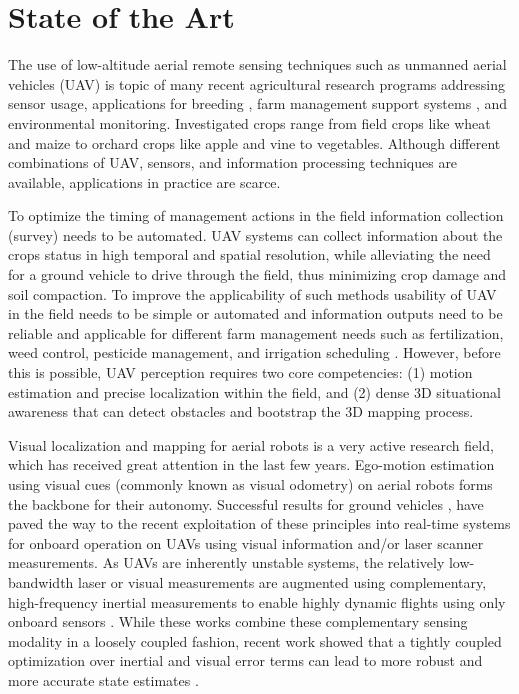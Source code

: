 \section{State of the Art}
\label{sec:State of the Art}

The use of low-altitude aerial remote sensing techniques such as unmanned aerial vehicles (UAV) is topic of many recent agricultural research programs addressing sensor usage, applications for breeding \cite{araus2014field}, farm management support systems \cite{primicerio2012flexible}, \cite{corcoles2013estimation} and environmental monitoring. Investigated crops range from field crops like wheat and maize to orchard crops like apple and vine to vegetables. Although different combinations of UAV, sensors, and information processing techniques are available, applications in practice are scarce.

To optimize the timing of management actions in the field information collection (survey) needs to be automated. UAV systems can collect information about the crops status in high temporal and spatial resolution, while alleviating the need for a ground vehicle to drive through the field, thus minimizing crop damage and soil compaction. To improve the applicability of such methods usability of UAV in the field needs to be simple or automated and information outputs need to be reliable and applicable for different farm management needs such as fertilization, weed control, pesticide management, and irrigation scheduling \cite{bongiovanni2004precision}. However, before this is possible, UAV perception requires two core competencies: (1) motion estimation and precise localization within the field, and (2) dense 3D situational awareness that can detect obstacles and bootstrap the 3D mapping process.

Visual localization and mapping for aerial robots is a very active research field, which has received great attention in the last few years. Ego-motion estimation using visual cues (commonly known as visual odometry) on aerial robots forms the backbone for their autonomy. Successful results for ground vehicles \cite{konolige2008outdoor,konolige2011large,comport2010real}, have paved the way to the recent exploitation of these principles into real-time systems for onboard operation on UAVs using visual information and/or laser scanner measurements. As UAVs are inherently unstable systems, the relatively low-bandwidth laser or visual measurements are augmented using complementary, high-frequency inertial measurements to enable highly dynamic flights using only onboard sensors \cite{shen2011autonomous,weiss2012real,weiss2012versatile,steder2008visual}. While these works combine these complementary sensing modality in a loosely coupled fashion, recent work showed that a tightly coupled optimization over inertial and visual error terms can lead to more robust and more accurate state estimates \cite{leutenegger_rss13,Li2013c}.

